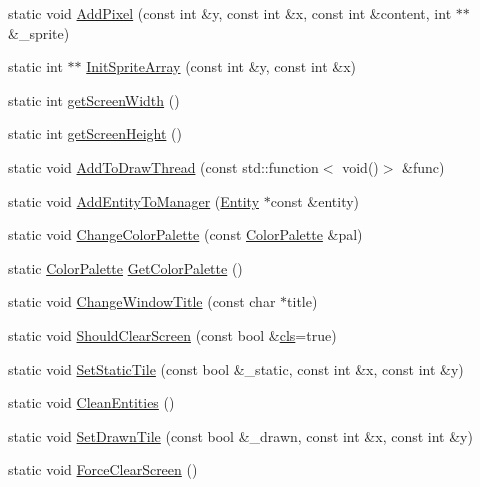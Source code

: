 \begin{DoxyCompactItemize}
\item 
static void \hyperlink{classrl_util_j_m_a0ef1e4ced4409dd7cae55c98a4bc27cd}{Add\+Pixel} (const int \&y, const int \&x, const int \&content, int $\ast$$\ast$\&\+\_\+sprite)
\item 
static int $\ast$$\ast$ \hyperlink{classrl_util_j_m_ab436632258aae9ef4a26626eddd41d84}{Init\+Sprite\+Array} (const int \&y, const int \&x)
\item 
static int \hyperlink{classrl_util_j_m_a72e4969b98d728c9b27b7c515101874f}{get\+Screen\+Width} ()
\item 
static int \hyperlink{classrl_util_j_m_a6e984d89ab3e4c086561e3747f7ea4ac}{get\+Screen\+Height} ()
\item 
static void \hyperlink{classrl_util_j_m_adb7f531e1a2608a1d733be327a5bb528}{Add\+To\+Draw\+Thread} (const std\+::function$<$ void()$>$ \&func)
\item 
static void \hyperlink{classrl_util_j_m_ae7cd27af31fab44d6bfb7f97139394e1}{Add\+Entity\+To\+Manager} (\hyperlink{class_entity}{Entity} $\ast$const \&entity)
\item 
static void \hyperlink{classrl_util_j_m_afc4417768a9d85a87db09ec0eb7b5f75}{Change\+Color\+Palette} (const \hyperlink{class_color_palette}{Color\+Palette} \&pal)
\item 
static \hyperlink{class_color_palette}{Color\+Palette} \hyperlink{classrl_util_j_m_a7c2712b6313fc11053bb2b85ba359a71}{Get\+Color\+Palette} ()
\item 
static void \hyperlink{classrl_util_j_m_a7cb21b69316862af266fbd085ea80f97}{Change\+Window\+Title} (const char $\ast$title)
\item 
static void \hyperlink{classrl_util_j_m_a78f6a6c06bce80e04fe3df7d6ba38afe}{Should\+Clear\+Screen} (const bool \&\hyperlink{rlutil_8h_a90cf62e5fababbb0a99aa405a74899ac}{cls}=true)
\item 
static void \hyperlink{classrl_util_j_m_a90e0883ca7f6dd2063fcde3480830808}{Set\+Static\+Tile} (const bool \&\+\_\+static, const int \&x, const int \&y)
\item 
static void \hyperlink{classrl_util_j_m_aa04c7a7bc0538a74f79acd2b37c497c6}{Clean\+Entities} ()
\item 
static void \hyperlink{classrl_util_j_m_a9c4237973b2b58d8184e423da86c3bcb}{Set\+Drawn\+Tile} (const bool \&\+\_\+drawn, const int \&x, const int \&y)
\item 
static void \hyperlink{classrl_util_j_m_a930b84b615e254f3cb2e83d70c346e94}{Force\+Clear\+Screen} ()
\end{DoxyCompactItemize}
